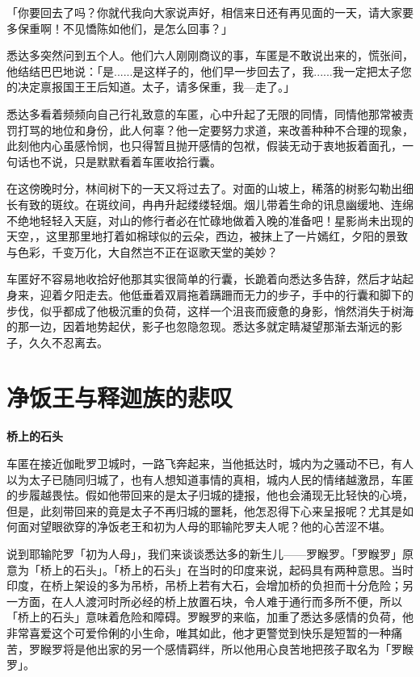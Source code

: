 \documentclass[12pt,twoside,openany]{book}
\newcommand{\mt}[1]{\textbullet \textbf{#1}}
\begin{document}
「你要回去了吗？你就代我向大家说声好，相信来日还有再见面的一天，请大家要多保重啊！不见憍陈如他们，是怎么回事？」

悉达多突然问到五个人。他们六人刚刚商议的事，车匿是不敢说出来的，慌张间，他结结巴巴地说：「是......是这样子的，他们早一步回去了，我......我一定把太子您的决定禀报国王王后知道。太子，请多保重，我---走了。」

悉达多看着频频向自己行礼致意的车匿，心中升起了无限的同情，同情他那常被责罚打骂的地位和身份，此人何辜？他一定要努力求道，来改善种种不合理的现象，此刻他内心虽感怜悯，也只得暂且抛开感情的包袱，假装无动于衷地扳着面孔，一句话也不说，只是默默看着车匿收拾行囊。

在这傍晚时分，林间树下的一天又将过去了。对面的山坡上，稀落的树影勾勒出细长有致的斑纹。在斑纹间，冉冉升起缕缕轻烟。烟儿带着生命的讯息幽缓地、连绵不绝地轻轻入天庭，对山的修行者必在忙碌地做着入晚的准备吧！星影尚未出现的天空，，这里那里地打着如棉球似的云朵，西边，被抹上了一片嫣红，夕阳的景致与色彩，千变万化，大自然岂不正在讴歌天堂的美妙？

车匿好不容易地收拾好他那其实很简单的行囊，长跪着向悉达多告辞，然后才站起身来，迎着夕阳走去。他低垂着双肩拖着蹒跚而无力的步子，手中的行囊和脚下的步伐，似乎都成了他极沉重的负荷，这样一个沮丧而疲惫的身影，悄然消失于树海的那一边，因着地势起伏，影子也忽隐忽现。悉达多就定睛凝望那渐去渐远的影子，久久不忍离去。

\section{净饭王与释迦族的悲叹}\label{sec1.4}

\mt{桥上的石头}

车匿在接近伽毗罗卫城时，一路飞奔起来，当他抵达时，城内为之骚动不已，有人以为太子已随同归城了，也有人想知道事情的真相，城内人民的情绪越激昂，车匿的步履越畏怯。假如他带回来的是太子归城的捷报，他也会涌现无比轻快的心境，但是，此刻带回来的竟是太子不再归城的噩耗，他怎忍得下心来呈报呢？尤其是如何面对望眼欲穿的净饭老王和初为人母的耶输陀罗夫人呢？他的心苦涩不堪。

说到耶输陀罗「初为人母」，我们来谈谈悉达多的新生儿——罗睺罗。「罗睺罗」原意为「桥上的石头」。「桥上的石头」在当时的印度来说，起码具有两种意思。当时印度，在桥上架设的多为吊桥，吊桥上若有大石，会增加桥的负担而十分危险；另一方面，在人人渡河时所必经的桥上放置石块，令人难于通行而多所不便，所以「桥上的石头」意味着危险和障碍。罗睺罗的来临，加重了悉达多感情的负荷，他非常喜爱这个可爱伶俐的小生命，唯其如此，他才更警觉到快乐是短暂的一种痛苦，罗睺罗将是他出家的另一个感情羁绊，所以他用心良苦地把孩子取名为「罗睺罗」。
\end{document}
